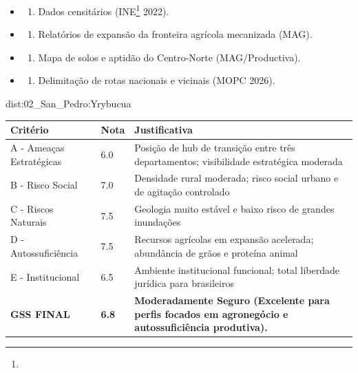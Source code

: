 {\begin{itemize}
\tightlist
\item
  \begin{enumerate}
  \def\labelenumi{\arabic{enumi})}
  \tightlist
  \item
    Dados censitários (INE\footnote{\fineINE} 2022).
  \end{enumerate}
\item
  \begin{enumerate}
  \def\labelenumi{\arabic{enumi})}
  \setcounter{enumi}{1}
  \tightlist
  \item
    Relatórios de expansão da fronteira agrícola mecanizada (MAG).
  \end{enumerate}
\item
  \begin{enumerate}
  \def\labelenumi{\arabic{enumi})}
  \setcounter{enumi}{2}
  \tightlist
  \item
    Mapa de solos e aptidão do Centro-Norte (MAG/\allowbreak Productiva).
  \end{enumerate}
\item
  \begin{enumerate}
  \def\labelenumi{\arabic{enumi})}
  \setcounter{enumi}{3}
  \tightlist
  \item
    Delimitação de rotas nacionais e vicinais (MOPC 2026).
  \end{enumerate}
\end{itemize}}{dist:02_San_Pedro:Yrybucua}
\begin{table}[ht!]
\small \begin{tabular}{p{3.0cm}p{0.8cm}p{6.0cm}} \toprule
\textbf{Critério} & \textbf{Nota} & \textbf{Justificativa} \\ \midrule
A - Ameaças Estratégicas & 6.0 & Posição de hub de transição entre três departamentos; visibilidade estratégica moderada \\
B - Risco Social & 7.0 & Densidade rural moderada; risco social urbano e de agitação controlado \\
C - Riscos Naturais & 7.5 & Geologia muito estável e baixo risco de grandes inundações \\
D - Autossuficiência & 7.5 & Recursos agrícolas em expansão acelerada; abundância de grãos e proteína animal \\
E - Institucional & 6.5 & Ambiente institucional funcional; total liberdade jurídica para brasileiros \\
\midrule \textbf{GSS FINAL} & \textbf{6.8} & \textbf{Moderadamente Seguro (Excelente para perfis focados em agronegócio e autossuficiência produtiva).} \\ \bottomrule \end{tabular}
\end{table}
